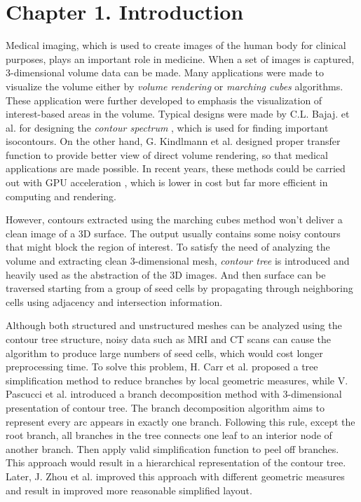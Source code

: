 \documentclass[11pt, b5paper]{report}
\begin{document}
% 
\chapter*{Chapter 1. Introduction}
\label{ch:intro}

Medical imaging, which is used to create images of the human body for clinical
purposes, plays an important role in medicine. When a set of images is 
captured, 3-dimensional volume data can be made. Many applications were made
to visualize the volume either by \emph{volume rendering} 
\cite{drebin1988volume} or \emph{marching cubes} \cite{lorensen1987marching} 
algorithms. These application were further developed to emphasis the 
visualization of interest-based areas in the volume. Typical designs were made by 
C.L. Bajaj. et al. for designing the \emph{contour spectrum}
\cite{bajaj1997contour}, which is used for finding important isocontours. 
On the other hand, G. Kindlmann et al.\cite{kindlmann1998semi} designed 
proper transfer function to provide better view of direct volume rendering, 
so that medical applications are made possible. In recent years, these 
methods could be carried out with GPU acceleration 
\cite{kruger2003acceleration}, which is lower in cost but far more efficient 
in computing and rendering. 

However, contours extracted using the marching cubes method won't deliver a 
clean image of a 3D surface. The output usually contains some noisy contours
that might block the region of interest. To satisfy the need of analyzing the 
volume and extracting clean 3-dimensional mesh, \emph{contour tree} 
\cite{van1997contour} is introduced and heavily used as the abstraction of 
the 3D images. And then surface can be traversed starting from a group of 
seed cells by propagating through neighboring cells using adjacency and 
intersection information.

Although both structured and unstructured meshes can be analyzed using
the contour tree structure, noisy data such as MRI and CT scans can cause 
the algorithm to produce large numbers of seed cells, which would cost 
longer preprocessing time. To solve this problem, H. Carr et al.
\cite{carr2004simplifying} proposed a tree simplification method to 
reduce branches by local geometric measures, while V. Pascucci et al.
\cite{pascucci04:_multi} introduced a branch decomposition method with 
3-dimensional presentation of contour tree. The branch decomposition 
algorithm aims to represent every arc appears in exactly one branch. 
Following this rule, except the root branch, all branches in the tree 
connects one leaf to an interior node of another branch. Then apply
valid simplification function to peel off branches. This approach would
result in a hierarchical representation of the contour tree.
Later, J. Zhou et al.\cite{zhou2008contour} improved this approach with
different geometric measures and result in improved more reasonable 
simplified layout.
\end{document}
